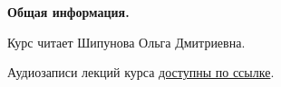 \documentclass[main.tex]{subfiles}
\begin{document}
{\parindent0pt

\textbf{Общая информация.}

Курс читает Шипунова Ольга Дмитриевна.

Аудиозаписи лекций курса \href{https://drive.google.com/drive/folders/1iSx2EjJJ98rhPpOsM4xGcJA7-7qitQHM?usp=sharing}{доступны по ссылке}.
}
\end{document}
